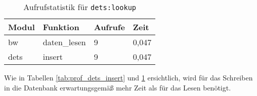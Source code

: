 \begin{table}[H]
	\centering
	\caption{Aufrufstatistik für \texttt{dets:lookup}}
	\label{tab:prof_dets_lookup}
	\begin{tabular}{p{1.2cm}|p{5cm}|p{2cm}|p{2cm}}
		Modul & Funktion & Aufrufe & Zeit \\
		\hline
		\hline
		bw & daten\_lesen & 9 & 0,047 \\
		\hline
		dets & insert & 9 & 0,047
	\end{tabular}
\end{table}

Wie in Tabellen \ref{tab:prof_dets_insert} und \ref{tab:prof_dets_lookup} ersichtlich, wird für das Schreiben in die Datenbank erwartungsgemäß mehr Zeit als für das Lesen benötigt.